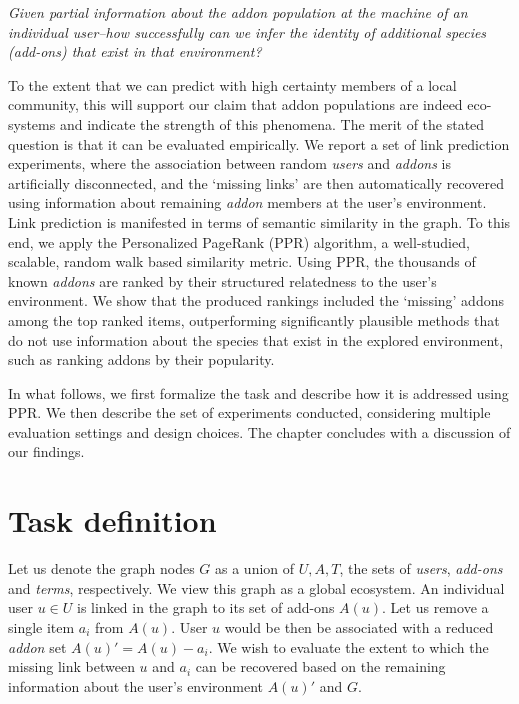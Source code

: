 \documentclass[11pt,oneside]{book}
\let\Oldsection\section
\renewcommand{\section}{\FloatBarrier\Oldsection}
\begin{document}
{\it Given partial information about the addon population at the machine of an individual user--how successfully can we infer the identity of additional species (add-ons) that exist in that environment?}

To the extent that we can predict with high certainty members of a local community, this will support our claim that addon populations are indeed eco-systems and indicate the strength of this phenomena. The merit of the stated
question is that it can be evaluated empirically. We report a
set of link prediction experiments, where the association between random {\it users} and {\it addons} is artificially disconnected, and the `missing links' are then automatically recovered using information about remaining {\it addon} members at the user's environment. Link prediction is manifested in terms of semantic similarity in the graph. To this end, we apply the Personalized
PageRank (PPR) algorithm, a well-studied, scalable, random walk based similarity metric. Using PPR, the thousands of known {\it addons} are ranked by their structured relatedness to the user's environment. We show that the produced rankings included the `missing' addons among the top ranked items, outperforming significantly plausible methods that do not use information about the species that exist in the explored environment, such as ranking addons by their popularity. 

In what follows, we first formalize the task and describe how it is addressed using PPR. We then describe the set of experiments conducted, considering multiple evaluation settings and design choices. The chapter concludes with a discussion of our findings.

\section{Task definition}
\label{sec:task}

Let us denote the graph nodes $G$ as a union of $U,A,T$, the sets of
{\it users}, {\it add-ons} and {\it terms}, respectively. We view this
graph as a global ecosystem. An individual user $u\in U$ is linked in
the graph to its set of add-ons $A(u)$. Let us remove a single item $a_i$
from $A(u)$. User $u$ would be then be associated with a reduced {\it
  addon} set $A(u)'=A(u)-a_i$. We wish to evaluate the extent to which the missing link between $u$ and $a_i$ can be recovered based on the remaining information about the user's environment $A(u)'$ and $G$.
\end{document}

